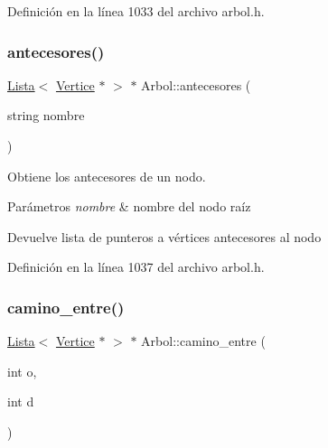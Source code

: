 Definición en la línea 1033 del archivo arbol.\+h.

\mbox{\label{classArbol_aa975d5d9cf5fcfc392a8200bd0078d1c}} 
\subsubsection{\texorpdfstring{antecesores()}{antecesores()}\hspace{0.1cm}{\footnotesize\ttfamily [2/2]}}
{\footnotesize\ttfamily \hyperlink{classLista}{Lista}$<$ \hyperlink{classVertice}{Vertice} $\ast$ $>$ $\ast$ Arbol\+::antecesores (\begin{DoxyParamCaption}\item[{string}]{nombre }\end{DoxyParamCaption})}



Obtiene los antecesores de un nodo. 


\begin{DoxyParams}{Parámetros}
{\em nombre} & nombre del nodo raíz \\
\hline
\end{DoxyParams}
\begin{DoxyReturn}{Devuelve}
lista de punteros a vértices antecesores al nodo 
\end{DoxyReturn}


Definición en la línea 1037 del archivo arbol.\+h.

\mbox{\label{classArbol_accfa606c5f5e67b6ab18c4490075cf39}} 
\subsubsection{\texorpdfstring{camino\+\_\+entre()}{camino\_entre()}\hspace{0.1cm}{\footnotesize\ttfamily [1/2]}}
{\footnotesize\ttfamily \hyperlink{classLista}{Lista}$<$ \hyperlink{classVertice}{Vertice} $\ast$ $>$ $\ast$ Arbol\+::camino\+\_\+entre (\begin{DoxyParamCaption}\item[{int}]{o,  }\item[{int}]{d }\end{DoxyParamCaption})}



